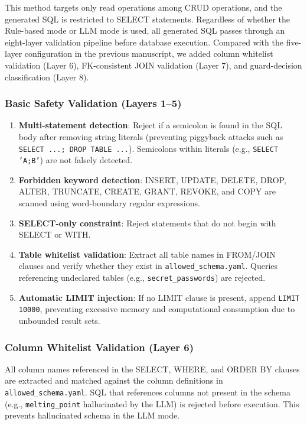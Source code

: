 \documentclass[5p,twocolumn]{elsarticle}
\begin{document}
This method targets only read operations among CRUD operations,
and the generated SQL is restricted to SELECT statements.
Regardless of whether the Rule-based mode or LLM mode is used,
all generated SQL passes through an eight-layer validation pipeline before database execution.
Compared with the five-layer configuration in the previous manuscript, we added
column whitelist validation (Layer 6),
FK-consistent JOIN validation (Layer 7), and guard-decision classification (Layer 8).

\subsubsection{Basic Safety Validation (Layers 1--5)}

\begin{enumerate}
  \item \textbf{Multi-statement detection}: Reject if a semicolon is found in the SQL body after removing string literals
    (preventing piggyback attacks such as \texttt{SELECT ...; DROP TABLE ...}).
    Semicolons within literals (e.g., \texttt{SELECT 'A;B'}) are not falsely detected.
  \item \textbf{Forbidden keyword detection}: INSERT, UPDATE, DELETE, DROP, ALTER,
    TRUNCATE, CREATE, GRANT, REVOKE, and COPY are scanned using word-boundary regular expressions.
  \item \textbf{SELECT-only constraint}: Reject statements that do not begin with SELECT or WITH.
  \item \textbf{Table whitelist validation}: Extract all table names in FROM/JOIN clauses and
    verify whether they exist in \texttt{allowed\_schema.yaml}.
    Queries referencing undeclared tables (e.g., \texttt{secret\_passwords}) are rejected.
  \item \textbf{Automatic LIMIT injection}: If no LIMIT clause is present, append \texttt{LIMIT 10000},
    preventing excessive memory and computational consumption due to unbounded result sets.
\end{enumerate}

\subsubsection{Column Whitelist Validation (Layer 6)}
\label{sec:column_wl}

All column names referenced in the SELECT, WHERE, and ORDER BY clauses are extracted and
matched against the column definitions in \texttt{allowed\_schema.yaml}.
SQL that references columns not present in the schema (e.g., \texttt{melting\_point} hallucinated by the LLM)
is rejected before execution.
This prevents hallucinated schema in the LLM mode.
\end{document}
